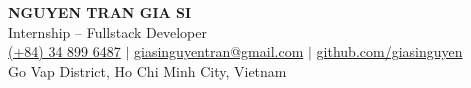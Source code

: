 \documentclass[letterpaper,11pt]{article}
\begin{document}
\begin{center}
    {\LARGE\bfseries\color{harvardcrimson} NGUYEN TRAN GIA SI} \\[6pt]
    {\large Internship -- Fullstack Developer} \\[6pt]
    \href{tel:+84348996487}{(+84) 34 899 6487} \enspace$\vert$\enspace
    \href{mailto:giasinguyentran@gmail.com}{giasinguyentran@gmail.com} \enspace$\vert$\enspace
    \href{https://github.com/giasinguyen}{github.com/giasinguyen} \\[2pt]
    Go Vap District, Ho Chi Minh City, Vietnam
\end{center}

\vspace{-4pt}






\end{document}
